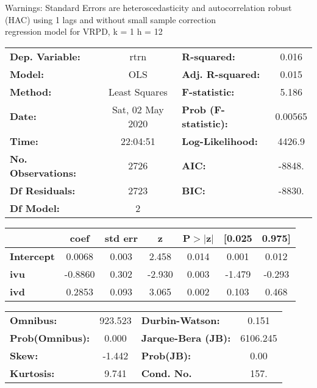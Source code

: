 Warnings: \newline
 [1] Standard Errors are heteroscedasticity and autocorrelation robust (HAC) using 1 lags and without small sample correction\\ 

regression model for VRPD, k = 1 h = 12\begin{center}
\begin{tabular}{lclc}
\toprule
\textbf{Dep. Variable:}    &       rtrn       & \textbf{  R-squared:         } &     0.016   \\
\textbf{Model:}            &       OLS        & \textbf{  Adj. R-squared:    } &     0.015   \\
\textbf{Method:}           &  Least Squares   & \textbf{  F-statistic:       } &     5.186   \\
\textbf{Date:}             & Sat, 02 May 2020 & \textbf{  Prob (F-statistic):} &  0.00565    \\
\textbf{Time:}             &     22:04:51     & \textbf{  Log-Likelihood:    } &    4426.9   \\
\textbf{No. Observations:} &        2726      & \textbf{  AIC:               } &    -8848.   \\
\textbf{Df Residuals:}     &        2723      & \textbf{  BIC:               } &    -8830.   \\
\textbf{Df Model:}         &           2      & \textbf{                     } &             \\
\bottomrule
\end{tabular}
\begin{tabular}{lcccccc}
                   & \textbf{coef} & \textbf{std err} & \textbf{z} & \textbf{P$> |$z$|$} & \textbf{[0.025} & \textbf{0.975]}  \\
\midrule
\textbf{Intercept} &       0.0068  &        0.003     &     2.458  &         0.014        &        0.001    &        0.012     \\
\textbf{ivu}       &      -0.8860  &        0.302     &    -2.930  &         0.003        &       -1.479    &       -0.293     \\
\textbf{ivd}       &       0.2853  &        0.093     &     3.065  &         0.002        &        0.103    &        0.468     \\
\bottomrule
\end{tabular}
\begin{tabular}{lclc}
\textbf{Omnibus:}       & 923.523 & \textbf{  Durbin-Watson:     } &    0.151  \\
\textbf{Prob(Omnibus):} &   0.000 & \textbf{  Jarque-Bera (JB):  } & 6106.245  \\
\textbf{Skew:}          &  -1.442 & \textbf{  Prob(JB):          } &     0.00  \\
\textbf{Kurtosis:}      &   9.741 & \textbf{  Cond. No.          } &     157.  \\
\bottomrule
\end{tabular}
\end{center}

